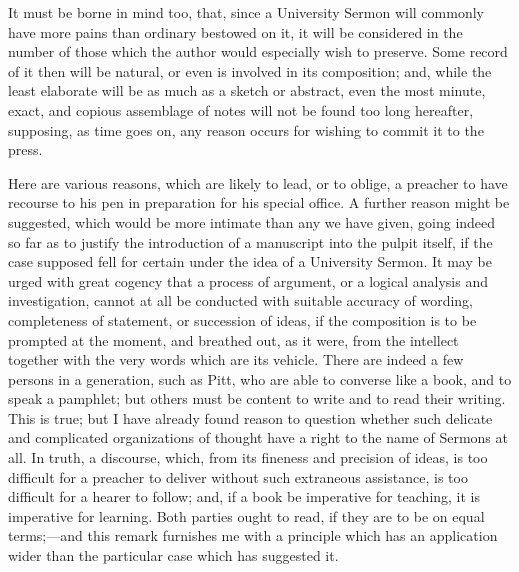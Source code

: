 It must be borne in mind too, that, since a University Sermon will
commonly have more pains than ordinary bestowed on it, it will be
considered in the number of those which the author would especially
wish to preserve. Some record of it then will be natural, or even is
involved in its composition; and, while the least elaborate will be as
much as a sketch or abstract, even the most minute, exact, and copious
assemblage of notes will not be found too long hereafter, supposing,
as time goes on, any reason occurs for wishing to commit it to the
press.

Here are various reasons, which are likely to lead, or to oblige, a
preacher to have recourse to his pen in preparation for his special
office. A further reason might be suggested, which would be more
intimate than any we have given, going indeed so far as to justify the
introduction of a manuscript into the pulpit itself, if the case
supposed fell for certain under the idea of a University Sermon. It
may be urged with great cogency that a process of argument, or a
logical analysis and investigation, cannot at all be conducted with
suitable accuracy of wording, completeness of statement, or succession
of ideas, if the composition is to be prompted at the moment, and
breathed out, as it were, from the intellect together with the very
words which are its vehicle. There are indeed a few persons in a
generation, such as Pitt, who are able to converse like a book, and to
speak a pamphlet; but others must be content to write and to read
their writing. This is true; but I have already found reason to
question whether such delicate and complicated organizations of
thought have a right to the name of Sermons at all. In truth, a
discourse, which, from its fineness and precision of ideas, is too
difficult for a preacher to deliver without such extraneous
assistance, is too difficult for a hearer to follow; and, if a book be
imperative for teaching, it is imperative for learning. Both parties
ought to read, if they are to be on equal terms;—and this remark
furnishes me with a principle which has an application wider than the
particular case which has suggested it.

